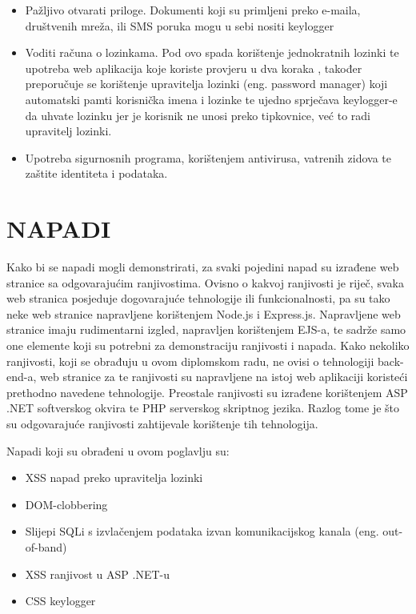 \documentclass[12pt, oneside, onecolumn]{book}
\begin{document}
{\begin{itemize}
\item Pažljivo otvarati priloge. Dokumenti koji su primljeni preko e-maila, društvenih mreža, ili SMS poruka mogu u sebi nositi keylogger
\item Voditi računa o lozinkama. Pod ovo spada korištenje jednokratnih lozinki te upotreba web aplikacija koje koriste provjeru u dva koraka , također preporučuje se korištenje upravitelja lozinki (eng. password manager) koji automatski pamti korisnička imena i lozinke te ujedno sprječava keylogger-e da uhvate lozinku jer je korisnik ne unosi preko tipkovnice, već to radi upravitelj lozinki.
\item Upotreba sigurnosnih programa, korištenjem antivirusa, vatrenih zidova te zaštite identiteta i podataka.
\end{itemize}

\chapter{NAPADI}

Kako bi se napadi mogli demonstrirati, za svaki pojedini napad su izrađene web stranice sa odgovarajućim ranjivostima. Ovisno o kakvoj ranjivosti je riječ, svaka web stranica posjeduje dogovarajuće tehnologije ili funkcionalnosti, pa su tako neke web stranice napravljene korištenjem Node.js i Express.js. Napravljene web stranice imaju rudimentarni izgled, napravljen korištenjem EJS-a, te sadrže samo one elemente koji su potrebni za demonstraciju ranjivosti i napada. Kako nekoliko ranjivosti, koji se obrađuju u ovom diplomskom radu, ne ovisi o tehnologiji back-end-a, web stranice za te ranjivosti su napravljene na istoj web aplikaciji koristeći prethodno navedene tehnologije. Preostale ranjivosti su izrađene korištenjem ASP .NET softverskog okvira te PHP serverskog skriptnog jezika. Razlog tome je što su odgovarajuće ranjivosti zahtijevale korištenje tih tehnologija.

Napadi koji su obrađeni u ovom poglavlju su:

\begin{itemize}
\item XSS napad preko upravitelja lozinki
\item DOM-clobbering
\item Slijepi SQLi s izvlačenjem podataka izvan komunikacijskog kanala (eng. out-of-band)
\item XSS ranjivost u ASP .NET-u
\item CSS keylogger
\end{itemize}

}
\end{document}
